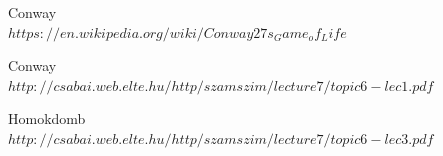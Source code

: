 \documentclass[paper=a4, fontsize=11pt]{article}
\begin{document}
\newpage
\begin{thebibliography}{}

Conway
\\\texttt{$https://en.wikipedia.org/wiki/Conway27s_Game_of_Life$}
 

Conway
\\\texttt{$http://csabai.web.elte.hu/http/szamszim/lecture7/topic6-lec1.pdf$}
 
 
Homokdomb
\\\texttt{$http://csabai.web.elte.hu/http/szamszim/lecture7/topic6-lec3.pdf$}
 

\end{thebibliography}
\end{document}
